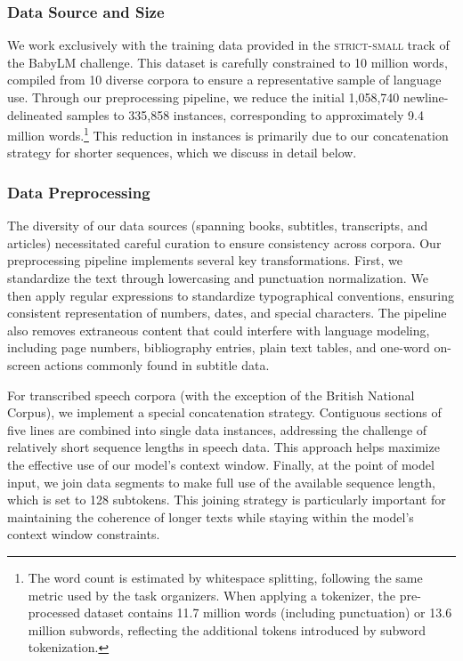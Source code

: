 \subsubsection{Data Source and Size}
We work exclusively with the training data provided in the \textsc{strict-small} track of the BabyLM challenge. This dataset is carefully constrained to 10 million words, compiled from 10 diverse corpora to ensure a representative sample of language use. Through our preprocessing pipeline, we reduce the initial 1,058,740 newline-delineated samples to 335,858 instances, corresponding to approximately 9.4 million words.\footnote{The word count is estimated by whitespace splitting, following the same metric used by the task organizers. When applying a tokenizer, the pre-processed dataset contains 11.7 million words (including punctuation) or 13.6 million subwords, reflecting the additional tokens introduced by subword tokenization.} This reduction in instances is primarily due to our concatenation strategy for shorter sequences, which we discuss in detail below.

\subsubsection{Data Preprocessing}
The diversity of our data sources (spanning books, subtitles, transcripts, and articles) necessitated careful curation to ensure consistency across corpora. Our preprocessing pipeline implements several key transformations. First, we standardize the text through lowercasing and punctuation normalization. We then apply regular expressions to standardize typographical conventions, ensuring consistent representation of numbers, dates, and special characters. The pipeline also removes extraneous content that could interfere with language modeling, including page numbers, bibliography entries, plain text tables, and one-word on-screen actions commonly found in subtitle data.

For transcribed speech corpora (with the exception of the British National Corpus), we implement a special concatenation strategy. Contiguous sections of five lines are combined into single data instances, addressing the challenge of relatively short sequence lengths in speech data. This approach helps maximize the effective use of our model's context window. Finally, at the point of model input, we join data segments to make full use of the available sequence length, which is set to 128 subtokens. This joining strategy is particularly important for maintaining the coherence of longer texts while staying within the model's context window constraints.

